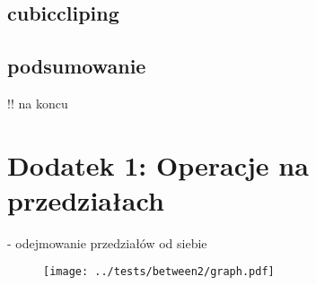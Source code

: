 \documentclass[11pt,a4paper,oneside]{report}
\begin{document}
\subsection{cubiccliping}

\subsection{podsumowanie}

!! na koncu

\section{Dodatek 1: Operacje na przedziałach}

- odejmowanie przedziałów od siebie



\begin{center}
\begin{figure}
\texttt{[image: ../tests/between2/graph.pdf]}
\end{figure}
\end{center}
\end{document}
